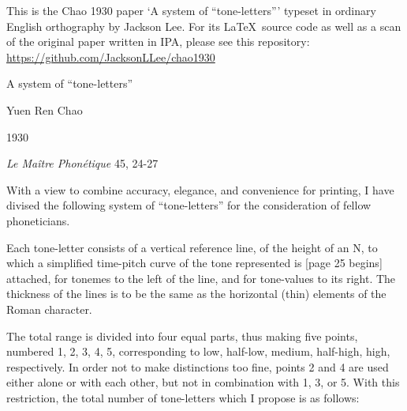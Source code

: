 \documentclass{article}
\begin{document}
\begin{framed}

This is the Chao 1930 paper `A system of ``tone-letters''' typeset in ordinary English orthography by Jackson Lee. For its \LaTeX\ source code as well as a scan of the original paper written in IPA, please see this repository: \\
\url{https://github.com/JacksonLLee/chao1930}

\end{framed}

\begin{center}

A system of ``tone-letters''

Yuen Ren Chao

1930

{\em Le Ma\^itre Phon\'etique} 45, 24-27

\end{center}


With a view to combine accuracy, elegance, and convenience for printing, I have divised the following system of ``tone-letters'' for the consideration of fellow phoneticians.

Each tone-letter consists of a vertical reference line, of the height of an N, to which a simplified time-pitch curve of the tone represented is [page 25 begins] attached, for tonemes to the left of the line, and for tone-values to its right. The thickness of the lines is to be the same as the horizontal (thin) elements of the Roman character.

The total range is divided into four equal parts, thus making five points, numbered 1, 2, 3, 4, 5, corresponding to low, half-low, medium, half-high, high, respectively. In order not to make distinctions too fine, points 2 and 4 are used either alone or with each other, but not in combination with 1, 3, or 5. With this restriction, the total number of tone-letters which I propose is as follows:
\end{document}
